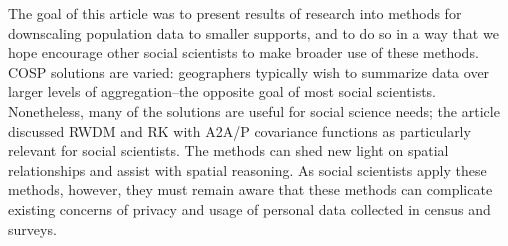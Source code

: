 \documentclass[]{interact}
\theoremstyle{plain}%
\theoremstyle{definition}
\theoremstyle{remark}
\begin{document}
The goal of this article was to present results of research into methods for downscaling population data to smaller supports, and to do so in a way that we hope encourage other social scientists to make broader use of these methods.  COSP solutions are varied: geographers typically wish to summarize data over larger levels of aggregation--the opposite goal of most social scientists.  Nonetheless, many of the solutions are useful for social science needs; the article discussed RWDM and RK with A2A/P covariance functions as particularly relevant for social scientists.  The methods can shed new light on spatial relationships and assist with spatial reasoning.  As social scientists apply these methods, however, they must remain aware that these methods can complicate existing concerns of privacy and usage of personal data collected in census and surveys.


\end{document}
